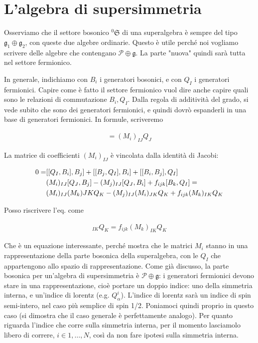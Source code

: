 \documentclass{report}
\begin{document}
\section{L'algebra di supersimmetria}

Osserviamo che il settore bosonico \({}^0\mathfrak{S}\) di una superalgebra è sempre del tipo \(\mathfrak{g}_1 \oplus \mathfrak{g}_2\), con queste due algebre ordinarie. Questo è utile perché noi vogliamo scrivere delle algebre che contengano \(\mathcal{P} \oplus \mathfrak{g}\). La parte "nuova" quindi sarà tutta nel settore fermionico. 

In generale, indichiamo con \(B_i\) i generatori bosonici, e con \(Q_I\) i generatori fermionici. Capire come è fatto il settore fermionico vuol dire anche capire quali sono le relazioni di commutazione \(B_i, Q_I\). Dalla regola di additività del grado, si vede subito che sono dei generatori fermionici, e quindi dovrò espanderli in una base di generatori fermionici. In formule, scriveremo 

\begin{align}
    [Q_I, B_i] = (M_i)_{IJ}Q_J 
\end{align}

La matrice di coefficienti \((M_i)_{IJ}\) è vincolata dalla identità di Jacobi: 

\begin{align}
    0 = &[[Q_I, B_i], B_j] + [[B_j, Q_I], B_i] + [[B_i, B_j], Q_I] \notag \\
    &(M_i)_{IJ}[Q_J, B_j] - (M_j)_{IJ}[Q_J, B_i] + f_{ijk}[B_k, Q_I] = \notag \\
    &(M_i)_{IJ}(M_k){JK}Q_K - (M_j)_{IJ}(M_i)_{JK}Q_K + f_{ijk}(M_k)_{IK}Q_K 
\end{align}

Posso riscrivere l'eq. come 

\begin{align}
    [M_i, M_j]_{IK}Q_K = f_{ijk}(M_k)_{IK}Q_K
\end{align}

Che è un equazione interessante, perché mostra che le matrici \(M_i\) stanno in una rappresentazione della parte bosonica della superalgebra, con le \(Q_I\) che appartengono allo spazio di rappresentazione. Come già discusso, la parte bosonica per un'algebra di supersimmetria è \(\mathcal{P} \oplus \mathfrak{g}\): i generatori fermionici devono stare in una rappresentazione, cioè portare un doppio indice: uno della simmetria interna, e un'indice di lorentz (e.g. \(Q^i_\alpha\)). L'indice di lorentz sarà un indice di spin semi-intero, nel caso più semplice di spin 1/2. Poniamoci quindi proprio in questo caso (si dimostra che il caso generale è perfettamente analogo). Per quanto riguarda l'indice che corre sulla simmetria interna, per il momento lasciamolo libero di correre, \(i \in 1, \ldots, N\), così da non fare ipotesi sulla simmetria interna.  
\end{document}
